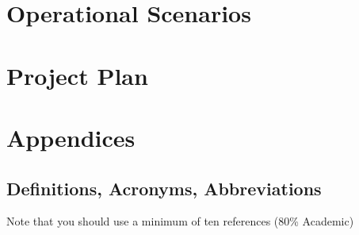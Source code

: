 \documentclass[12pt]{article}
\begin{document}


\section{Operational Scenarios}

\section{Project Plan}


\section{Appendices}

\subsection{Definitions, Acronyms, Abbreviations}


\printbibliography
Note that you should use a minimum of ten references (80\% Academic)
\end{document}
